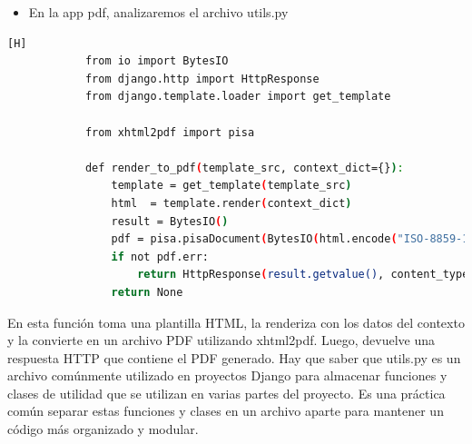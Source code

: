 \documentclass{article}
\begin{document}
        \begin{itemize}
            \item En la app pdf, analizaremos el archivo utils.py
        \end{itemize}
        \begin{lstlisting}[language=bash,caption={Archivo pdf/utils.py}][H]
            from io import BytesIO
            from django.http import HttpResponse
            from django.template.loader import get_template
            
            from xhtml2pdf import pisa
            
            def render_to_pdf(template_src, context_dict={}):
                template = get_template(template_src)
                html  = template.render(context_dict)
                result = BytesIO()
                pdf = pisa.pisaDocument(BytesIO(html.encode("ISO-8859-1")), result)
                if not pdf.err:
                    return HttpResponse(result.getvalue(), content_type='application/pdf')
                return None
	\end{lstlisting}
        En esta función toma una plantilla HTML, la renderiza con los datos del contexto y la convierte en un archivo PDF utilizando xhtml2pdf. Luego, devuelve una respuesta HTTP que contiene el PDF generado.
        Hay que saber que utils.py es un archivo comúnmente utilizado en proyectos Django para almacenar funciones y clases de utilidad que se utilizan en varias partes del proyecto. Es una práctica común separar estas funciones y clases en un archivo aparte para mantener un código más organizado y modular. \newline
\end{document}
